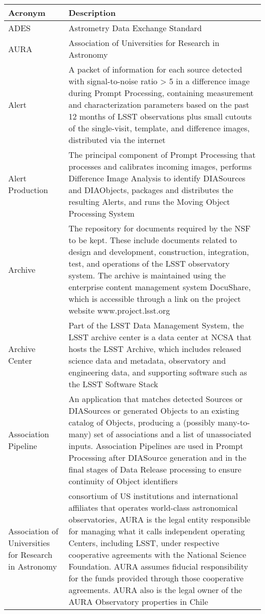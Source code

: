 \addtocounter{table}{-1}
\begin{longtable}{|p{}|p{}|}\hline
\textbf{Acronym} & \textbf{Description}  \\\hline

ADES & Astrometry Data Exchange Standard \\\hline
AURA & \gls{Association of Universities for Research in Astronomy} \\\hline
Alert & A packet of information for each source detected with signal-to-noise ratio > 5 in a difference image during \gls{Prompt Processing}, containing measurement and characterization parameters based on the past 12 months of \gls{LSST} observations plus small cutouts of the single-visit, template, and difference images, distributed via the internet \\\hline
Alert Production & The principal component of \gls{Prompt Processing} that processes and calibrates incoming images, performs \gls{Difference Image Analysis} to identify DIASources and DIAObjects, packages and distributes the resulting Alerts, and runs the \gls{Moving Object Processing System} \\\hline
Archive & The repository for documents required by the \gls{NSF} to be kept. These include documents related to design and development, construction, integration, test, and operations of the \gls{LSST} observatory system. The archive is maintained using the enterprise content management system \gls{DocuShare}, which is accessible through a link on the project website www.project.lsst.org \\\hline
Archive \gls{Center} & Part of the \gls{LSST} \gls{Data Management} System, the \gls{LSST} archive center is a data center at \gls{NCSA} that hosts the \gls{LSST} \gls{Archive}, which includes released science data and \gls{metadata}, observatory and engineering data, and supporting software such as the \gls{LSST} \gls{Software Stack} \\\hline
Association Pipeline & An application that matches detected Sources or DIASources or generated Objects to an existing catalog of Objects, producing a (possibly many-to-many) set of associations and a list of unassociated inputs. Association Pipelines are used in \gls{Prompt Processing} after \gls{DIASource} generation and in the final stages of \gls{Data Release} processing to ensure continuity of \gls{Object} identifiers \\\hline
Association of Universities for Research in Astronomy &  consortium of \gls{US} institutions and international affiliates that operates world-class astronomical observatories, \gls{AURA} is the legal entity responsible for managing what it calls independent operating Centers, including \gls{LSST}, under respective cooperative agreements with the \gls{National Science Foundation}. \gls{AURA} assumes fiducial responsibility for the funds provided through those cooperative agreements. \gls{AURA} also is the legal owner of the \gls{AURA} Observatory properties in Chile \\\hline

\end{longtable}
